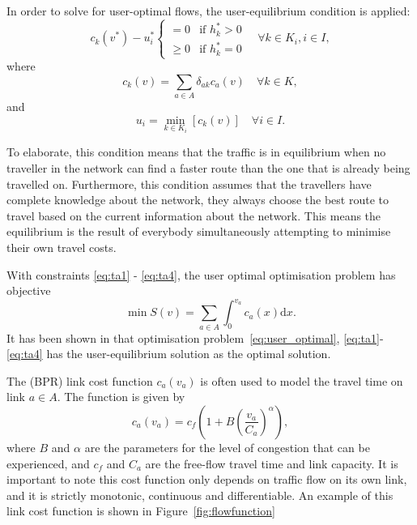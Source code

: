 In order to solve for user-optimal flows,
the \citet{Wardrop} user-equilibrium condition is applied:
\begin{equation} \label{wardrop1}
    c_k(v^{\ast}) - u_i^{\ast} 
    \begin{cases}
        =0 & \text{if } h_k^{\ast} > 0 \\
        \geq 0 & \text{if } h_k^{\ast} = 0
    \end{cases}
    \quad \forall k \in K_i, i \in I,
\end{equation}
where 
\begin{equation}
    c_k(v) = \sum_{a \in A} \delta_{ak} c_a(v) \quad \forall k \in K,
\end{equation}
and
\begin{equation} \label{wardrop3}
    u_i = \min_{k \in K_i} \left[ c_k(v) \right] \quad \forall i \in I.
\end{equation}

To elaborate, this condition means that the traffic is in equilibrium when no traveller in the network can find a faster route than the one that is already being travelled on.
Furthermore, this condition assumes that the travellers have complete knowledge about the network,
they always choose the best route to travel based on the current information about the network.
This means the equilibrium is the result of everybody simultaneously attempting to minimise their own travel costs.

With constraints \eqref{eq:ta1} - \eqref{eq:ta4},
the user optimal optimisation problem has objective
\begin{equation} \label{eq:user_optimal}
    \min S(v) = \sum_{a\in A} \int_0^{v_a} c_a(x) \mathrm{d} x.
\end{equation}
It has been shown in \citet{Florian} that optimisation problem~\eqref{eq:user_optimal}, \eqref{eq:ta1}-\eqref{eq:ta4} has the user-equilibrium solution as the optimal solution.

The \citet{BPR} (BPR) link cost function
$c_a(v_a)$ is often used to model the travel time on link $a \in A$.
The function is given by
\begin{equation}
    c_a(v_a) = c_f \left(1 + B \left( \frac{v_a}{C_a} \right)^\alpha \right),
\end{equation}
where $B$ and $\alpha$ are the parameters for the level of congestion that can be experienced,
and $c_f$ and $C_a$ are the free-flow travel time and link capacity.
It is important to note this cost function only depends on traffic flow on its own link, and it is strictly monotonic, continuous and differentiable.
An example of this link cost function is shown in Figure~\ref{fig:flowfunction}

